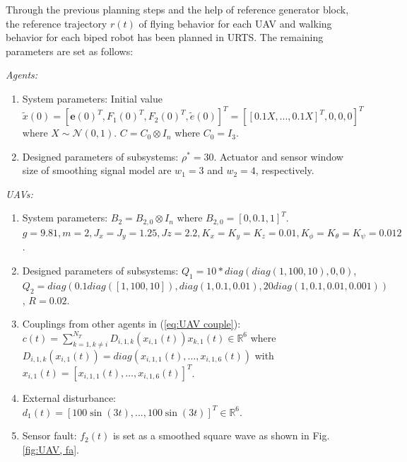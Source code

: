 \documentclass[journal,12pt,onecolumn,draftclsnofoot,]{IEEEtran}
\begin{document}
Through the previous planning steps and the help of reference generator block, the reference trajectory $r(t)$ of flying behavior for each UAV and walking behavior for each biped robot has been planned in URTS. The remaining parameters are set as follows:

\textit{Agents:}\begin{enumerate}
    \item System parameters:
    Initial value $\tilde{x}(0) = [\pmb{e}(0)^T\mathbin{,} F_1(0)^T\mathbin{,} F_2(0)^T, \tilde{e}(0)]^T = [[0.1X, ..., 0.1X]^T, 0, 0, 0]^T$ where $X \sim \mathcal{N}(0, 1)$. $C = C_0 \otimes I_n$ where $C_0 = I_3$.
    \item Designed parameters of subsystems: $\rho^*=30$. Actuator and sensor window size of smoothing signal model are $w_1=3$ and $w_2=4$, respectively.
\end{enumerate}

\textit{UAVs:}\begin{enumerate}
    \item System parameters:
    $B_2=B_{2,0}\otimes I_n$ where $B_{2,0} = [0, 0.1, 1]^T$.
    $g = 9.81, m = 2,
    J_x = J_y = 1.25, Jz = 2.2,
    K_x = K_y = K_z = 0.01,
    K_\phi = K_\theta = K_\psi = 0.012$.

    \item Designed parameters of subsystems: 
    $Q_1 = 10*diag(diag(1\mathbin{,} 100\mathbin{,} 10)\mathbin{,} 0\mathbin{,} 0)$, 
    $Q_2 = diag(0.1diag([1\mathbin{,} 100\mathbin{,} 10])\mathbin{,} diag(1,0.1, 0.01)\mathbin{,} 20diag(1, 0.1, 0.01\mathbin{,} 0.001))$, 
    $R = 0.02$.

    \item Couplings from other agents in (\ref{eq:UAV couple}):
    \\$c(t) = \sum_{k = 1, k \neq i}^{N_T}D_{i, 1, k}(x_{i, 1}(t))x_{k, 1}(t)\in\mathbb{R}^6$ where $D_{i, 1, k}(x_{i, 1}(t)) = diag(x_{i, 1, 1}(t)\mathbin{,}\dots\mathbin{,}x_{i, 1, 6}(t))$ with $x_{i, 1}(t) = [x_{i, 1, 1}(t)\mathbin{,}\dots\mathbin{,}x_{i, 1, 6}(t)]^T$.
    \item External disturbance:
    \\ $d_1(t) = [100\sin(3t)\mathbin{,} ...\mathbin{,} 100\sin(3t)]^T\in\mathbb{R}^6$.
    \item Sensor fault: $f_2(t)$ is set as a smoothed square wave as shown in Fig. \ref{fig:UAV, fa}.
\end{enumerate}
\end{document}
